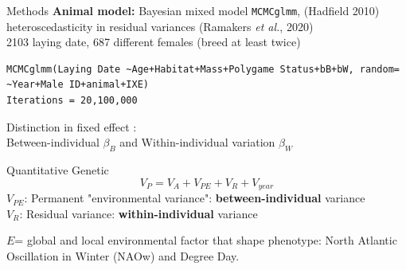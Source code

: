 \documentclass[compress]{beamer}
\begin{document}
\begin{frame}[fragile]{Methods}
\textbf{Animal model:} Bayesian mixed model \scriptsize {\texttt{MCMCglmm}, (Hadfield 2010)\\ heteroscedasticity in residual variances (Ramakers \textit{et al.}, 2020)} \\
\normalsize
2103 laying date, 687 different females (breed at least twice) 

\begin{lstlisting}[basicstyle=\footnotesize]
MCMCglmm(Laying Date ~Age+Habitat+Mass+Polygame Status+bB+bW, random= ~Year+Male ID+animal+IXE)        
Iterations = 20,100,000
\end{lstlisting}

   \vspace{-0.1cm}
 Distinction in fixed effect : \\ Between-individual $\beta_B$ and
 Within-individual variation $\beta_W$ 
 
  \vspace{0.1cm}
\begin{exampleblock}{Quantitative Genetic}
  \[ V_P=V_A+ V_{PE}+ V_R+ V_{year}\]
  \scriptsize 
  $V_{PE}$: Permanent "environmental variance": \textbf{between-individual} variance \\
  $V_R$: Residual variance: \textbf{within-individual} variance
\end{exampleblock}

   \normalsize
 \vspace{0.2cm}  
$E$= global and local environmental factor that shape phenotype: North Atlantic Oscillation in Winter (NAOw) and Degree Day.

\end{frame}
\end{document}
